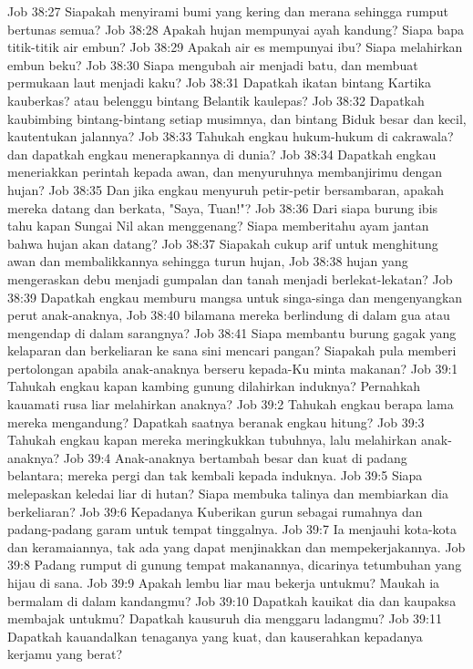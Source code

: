 Job 38:27  Siapakah menyirami bumi yang kering dan merana sehingga rumput bertunas semua?
Job 38:28  Apakah hujan mempunyai ayah kandung? Siapa bapa titik-titik air embun?
Job 38:29  Apakah air es mempunyai ibu? Siapa melahirkan embun beku?
Job 38:30  Siapa mengubah air menjadi batu, dan membuat permukaan laut menjadi kaku?
Job 38:31  Dapatkah ikatan bintang Kartika kauberkas? atau belenggu bintang Belantik kaulepas?
Job 38:32  Dapatkah kaubimbing bintang-bintang setiap musimnya, dan bintang Biduk besar dan kecil, kautentukan jalannya?
Job 38:33  Tahukah engkau hukum-hukum di cakrawala? dan dapatkah engkau menerapkannya di dunia?
Job 38:34  Dapatkah engkau meneriakkan perintah kepada awan, dan menyuruhnya membanjirimu dengan hujan?
Job 38:35  Dan jika engkau menyuruh petir-petir bersambaran, apakah mereka datang dan berkata, "Saya, Tuan!"?
Job 38:36  Dari siapa burung ibis tahu kapan Sungai Nil akan menggenang? Siapa memberitahu ayam jantan bahwa hujan akan datang?
Job 38:37  Siapakah cukup arif untuk menghitung awan dan membalikkannya sehingga turun hujan,
Job 38:38  hujan yang mengeraskan debu menjadi gumpalan dan tanah menjadi berlekat-lekatan?
Job 38:39  Dapatkah engkau memburu mangsa untuk singa-singa dan mengenyangkan perut anak-anaknya,
Job 38:40  bilamana mereka berlindung di dalam gua atau mengendap di dalam sarangnya?
Job 38:41  Siapa membantu burung gagak yang kelaparan dan berkeliaran ke sana sini mencari pangan? Siapakah pula memberi pertolongan apabila anak-anaknya berseru kepada-Ku minta makanan?
Job 39:1  Tahukah engkau kapan kambing gunung dilahirkan induknya? Pernahkah kauamati rusa liar melahirkan anaknya?
Job 39:2  Tahukah engkau berapa lama mereka mengandung? Dapatkah saatnya beranak engkau hitung?
Job 39:3  Tahukah engkau kapan mereka meringkukkan tubuhnya, lalu melahirkan anak-anaknya?
Job 39:4  Anak-anaknya bertambah besar dan kuat di padang belantara; mereka pergi dan tak kembali kepada induknya.
Job 39:5  Siapa melepaskan keledai liar di hutan? Siapa membuka talinya dan membiarkan dia berkeliaran?
Job 39:6  Kepadanya Kuberikan gurun sebagai rumahnya dan padang-padang garam untuk tempat tinggalnya.
Job 39:7  Ia menjauhi kota-kota dan keramaiannya, tak ada yang dapat menjinakkan dan mempekerjakannya.
Job 39:8  Padang rumput di gunung tempat makanannya, dicarinya tetumbuhan yang hijau di sana.
Job 39:9  Apakah lembu liar mau bekerja untukmu? Maukah ia bermalam di dalam kandangmu?
Job 39:10  Dapatkah kauikat dia dan kaupaksa membajak untukmu? Dapatkah kausuruh dia menggaru ladangmu?
Job 39:11  Dapatkah kauandalkan tenaganya yang kuat, dan kauserahkan kepadanya kerjamu yang berat?
